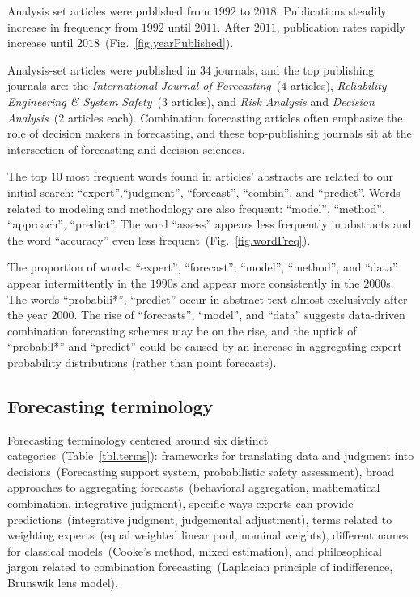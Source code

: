 \documentclass[preprint]{elsarticle}
\begin{document}
Analysis set articles were published from $1992$ to $2018$.
Publications steadily increase in frequency from $1992$ until $2011$.
After $2011$, publication rates rapidly increase until $2018$~(Fig.~\ref{fig.yearPublished}).

Analysis-set articles were published in $34$ journals, and the top publishing journals are: the \textit{International Journal of Forecasting}~($4$ articles), \textit{Reliability Engineering \& System Safety}~($3$ articles), and \textit{Risk Analysis} and \textit{Decision Analysis}~($2$ articles each).
Combination forecasting articles often emphasize the role of decision makers in forecasting, and
these top-publishing journals sit at the intersection of forecasting and decision sciences.

The top $10$ most frequent words found in articles' abstracts are related to our initial search: ``expert'',``judgment'', ``forecast'', ``combin'', and ``predict''.
Words related to modeling and methodology are also frequent: ``model'', ``method'', ``approach'', ``predict''.
The word ``assess'' appears less frequently in abstracts and the word ``accuracy'' even less frequent~(Fig.~\ref{fig.wordFreq}).

The proportion of words: ``expert'', ``forecast'', ``model'', ``method'', and ``data'' appear intermittently in the $1990$s and appear more consistently in the $2000$s.
The words ``probabili*'', ``predict'' occur in abstract text almost exclusively after the year $2000$.
The rise of ``forecasts'', ``model'', and ``data'' suggests data-driven combination forecasting schemes may be on the rise, and the 
uptick of ``probabil*'' and ``predict'' could be caused by an increase in aggregating expert probability distributions (rather than point forecasts).

\subsection{Forecasting terminology}

Forecasting terminology centered around six distinct categories~(Table~\ref{tbl.terms}): frameworks for translating data and judgment into decisions~(Forecasting support system, probabilistic safety assessment), broad approaches to aggregating forecasts~(behavioral aggregation, mathematical combination, integrative judgment), specific ways experts can provide predictions~(integrative judgment, judgemental adjustment), terms related to weighting experts~(equal weighted linear pool, nominal weights), different names for classical models~(Cooke's method, mixed estimation), and philosophical jargon related to combination forecasting~(Laplacian principle of indifference, Brunswik lens model). 
\end{document}

